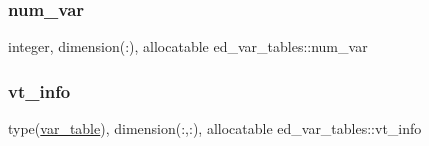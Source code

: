 \subsubsection{\texorpdfstring{num\+\_\+var}{num\_var}}
{\footnotesize\ttfamily integer, dimension(\+:), allocatable ed\+\_\+var\+\_\+tables\+::num\+\_\+var}

\mbox{\label{namespaceed__var__tables_a949fa9110a835bd59e16bd0a5e153498}} 
\subsubsection{\texorpdfstring{vt\+\_\+info}{vt\_info}}
{\footnotesize\ttfamily type(\hyperlink{structed__var__tables_1_1var__table}{var\+\_\+table}), dimension(\+:,\+:), allocatable ed\+\_\+var\+\_\+tables\+::vt\+\_\+info}


